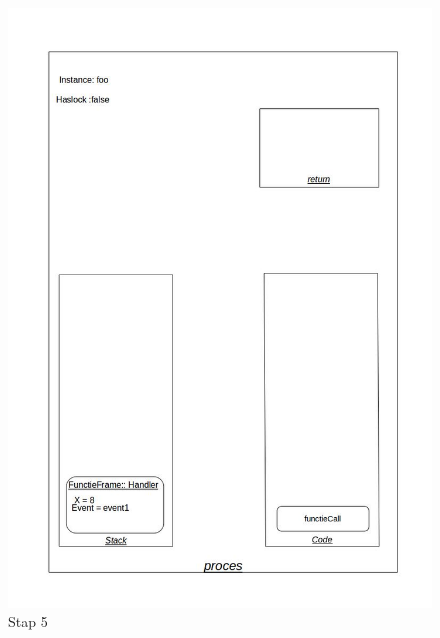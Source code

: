 \documentclass[]{article}
\begin{document}
\begin{figure}[H]
\centering
\includegraphics[scale=0.4]{AnalyseADTAlgorithm/processtappen/stap5.jpg}
\caption{Stap 5}
\end{figure}
\end{document}
